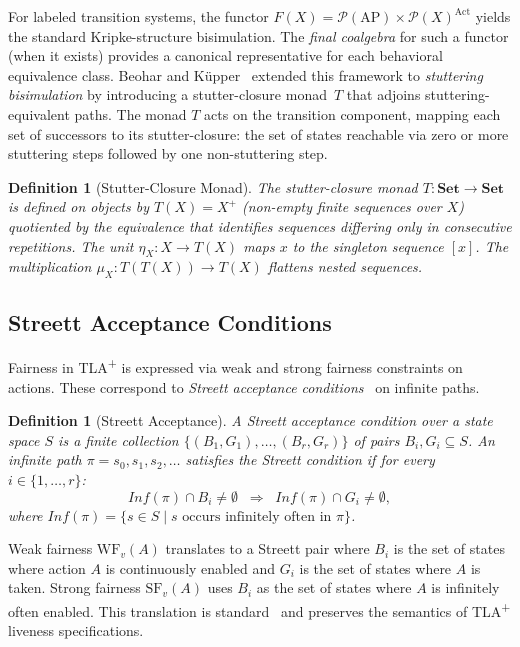 \documentclass[11pt]{article}
\newtheorem{definition}[theorem]{Definition}
\newcommand{\Set}{\mathbf{Set}}
\newcommand{\Pow}{\mathcal{P}}
\newcommand{\Act}{\ensuremath{\mathrm{Act}}}
\newcommand{\AP}{\ensuremath{\mathrm{AP}}}
\newcommand{\WF}{\ensuremath{\mathrm{WF}}}
\newcommand{\SF}{\ensuremath{\mathrm{SF}}}
\newcommand{\TLAplus}{TLA\textsuperscript{+}}
\begin{document}
For labeled transition systems, the functor
$F(X) = \Pow(\AP) \times \Pow(X)^{\Act}$ yields the standard
Kripke-structure bisimulation.
The \emph{final coalgebra} for such a functor (when it exists) provides
a canonical representative for each behavioral equivalence class.
Beohar and K\"upper~\cite{BeoharK17} extended this framework to
\emph{stuttering bisimulation} by introducing a stutter-closure monad~$T$
that adjoins stuttering-equivalent paths.
The monad $T$ acts on the transition component, mapping each set of
successors to its stutter-closure: the set of states reachable via
zero or more stuttering steps followed by one non-stuttering step.

\begin{definition}[Stutter-Closure Monad]
\label{def:stutter-monad}
The stutter-closure monad $T : \Set \to \Set$ is defined on objects by
$T(X) = X^+$ (non-empty finite sequences over $X$) quotiented by the
equivalence that identifies sequences differing only in consecutive
repetitions.
The unit $\eta_X : X \to T(X)$ maps $x$ to the singleton sequence $[x]$.
The multiplication $\mu_X : T(T(X)) \to T(X)$ flattens nested sequences.
\end{definition}

\subsection{Streett Acceptance Conditions}

Fairness in \TLAplus{} is expressed via weak and strong fairness constraints
on actions.
These correspond to \emph{Streett acceptance conditions}~\cite{Streett82}
on infinite paths.

\begin{definition}[Streett Acceptance]
\label{def:streett}
A \emph{Streett acceptance condition} over a state space $S$ is a finite
collection $\{(B_1, G_1), \ldots, (B_r, G_r)\}$ of pairs
$B_i, G_i \subseteq S$.
An infinite path $\pi = s_0, s_1, s_2, \ldots$ satisfies the Streett
condition if for every $i \in \{1, \ldots, r\}$:
\[
  \mathit{Inf}(\pi) \cap B_i \neq \emptyset
  \;\;\Longrightarrow\;\;
  \mathit{Inf}(\pi) \cap G_i \neq \emptyset,
\]
where $\mathit{Inf}(\pi) = \{s \in S \mid s \text{ occurs infinitely often
in } \pi\}$.
\end{definition}

Weak fairness $\WF_v(A)$ translates to a Streett pair where $B_i$ is the
set of states where action $A$ is continuously enabled and $G_i$ is the
set of states where $A$ is taken.
Strong fairness $\SF_v(A)$ uses $B_i$ as the set of states where $A$ is
infinitely often enabled.
This translation is standard~\cite{Lamport94,MannaP92} and preserves
the semantics of \TLAplus{} liveness specifications.
\end{document}
